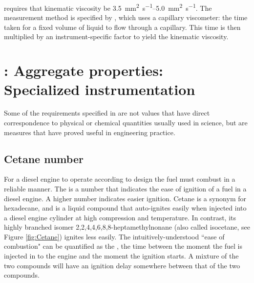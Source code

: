  requires that kinematic viscosity be
\SIrange{3.5}{5.0}{\milli\metre\squared\per\second}. The measurement method is
specified by , which uses a capillary viscometer: the time taken
for a fixed volume of liquid to flow through a capillary. This time is then
multiplied by an instrument-specific factor to yield the kinematic viscosity.

\section[\texorpdfstring{\std{SANS 1935}}{SANS 1935}: Aggregate properties: Specialized
in\-stru\-mentation]{\texorpdfstring{}{SANS 1935}: Aggregate properties: \\ Specialized
in\-stru\-mentation}

Some of the requirements specified in  are not values that have
direct correspondence to physical or chemical quantities usually used in
science, but are measures that have proved useful in engineering practice.

\subsection{Cetane number}

For a diesel engine to operate according to design the fuel must combust in a
reliable manner. The  is a number that indicates the ease
of ignition of a fuel in a diesel engine. A higher number indicates easier
ignition. Cetane is a synonym for hexadecane, and is a liquid compound that
auto-ignites easily when injected into a diesel engine cylinder at high
compression and temperature. In contrast, its highly branched isomer
2,2,4,4,6,8,8-heptamethylnonane (also called isocetane, see Figure
\ref{fig:Cetane}) ignites less easily. The intuitively-understood ``ease of
combustion" can be quantified as the , the time between
the moment the fuel is injected in to the engine and the moment the ignition
starts. A mixture of the two compounds will have an ignition delay somewhere
between that of the two compounds.

